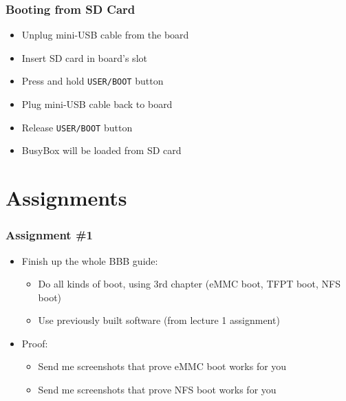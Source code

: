 \begin{frame}[fragile]
  \frametitle{Booting from SD Card}
  \begin{itemize}
    \item Unplug mini-USB cable from the board
    \item Insert SD card in board's slot
    \item Press and hold \texttt{USER/BOOT} button
    \item Plug mini-USB cable back to board
    \item Release \texttt{USER/BOOT} button
    \item BusyBox will be loaded from SD card
  \end{itemize}
\end{frame}

\section*{Assignments}

\begin{frame}
  \frametitle{Assignment \#1}
  \begin{itemize}
    \item Finish up the whole BBB guide:
      \begin{itemize}
        \item Do all kinds of boot, using 3rd chapter (eMMC boot, TFPT boot,
              NFS boot)
        \item Use previously built software (from lecture 1 assignment)
      \end{itemize}
    \item Proof:
      \begin{itemize}
        \item Send me screenshots that prove eMMC boot works for you
        \item Send me screenshots that prove NFS boot works for you
      \end{itemize}
  \end{itemize}
\end{frame}

